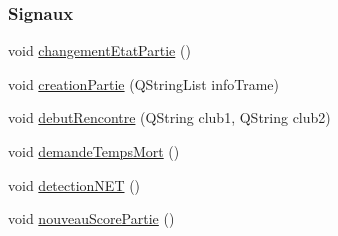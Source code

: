 \subsubsection*{Signaux}
\begin{DoxyCompactItemize}
\item 
void \hyperlink{class_communication_af5444d470230a6e817ca8bc9484eb169}{changement\+Etat\+Partie} ()
\item 
void \hyperlink{class_communication_a3d8a1dccee9867e6b84932ddc3072b45}{creation\+Partie} (Q\+String\+List info\+Trame)
\item 
void \hyperlink{class_communication_af3430c844d728e4ec3961744243324e1}{debut\+Rencontre} (Q\+String club1, Q\+String club2)
\item 
void \hyperlink{class_communication_ab2dd9f10ceaba18016017104683b6fc1}{demande\+Temps\+Mort} ()
\item 
void \hyperlink{class_communication_a4c828450e0ff92818c878ee28f240662}{detection\+N\+ET} ()
\item 
void \hyperlink{class_communication_acf4446d47652e0c508296e52df6fb11b}{nouveau\+Score\+Partie} ()
\end{DoxyCompactItemize}
